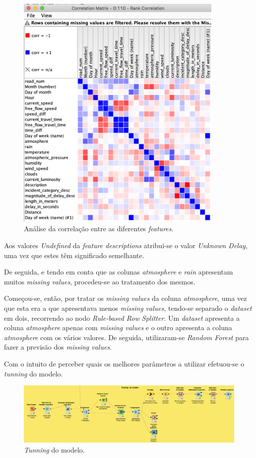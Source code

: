 \documentclass[a4paper, 12pt]{article}
\begin{document}
\begin{figure}[H]
	\centering
	\includegraphics[width=10cm]{rank}
	\caption{Análise da correlação entre as diferentes \textit{features}.}
\end{figure}

Aos valores \textit{Undefined} da \textit{feature descriptions} atribui-se o valor \textit{Unknown Delay}, uma vez que estes têm significado semelhante.

De seguida, e tendo em conta que as colunas \textit{atmosphere} e \textit{rain} apresentam muitos \textit{missing values}, procedeu-se ao tratamento dos mesmos. 

Começou-se, então, por tratar os \textit{missing values} da coluna \textit{atmosphere}, uma vez que esta era a que apresentava menos \textit{missing values}, tendo-se separado o \textit{dataset} em dois, recorrendo ao nodo \textit{Rule-based Row Splitter}. Um \textit{dataset} apresenta a coluna \textit{atmosphere} apenas com \textit{missing values} e o outro apresenta a coluna \textit{atmosphere} com os vários valores. De seguida, utilizaram-se \textit{Random Forest} para fazer a previsão dos \textit{missing values}.

Com o intuito de perceber quais os melhores parâmetros a utilizar efetuou-se o \textit{tunning} do modelo.

\begin{figure}[H]
	\centering
	\includegraphics[width=15cm]{tunning}
	\caption{\textit{Tunning} do modelo.}
\end{figure}
\end{document}
